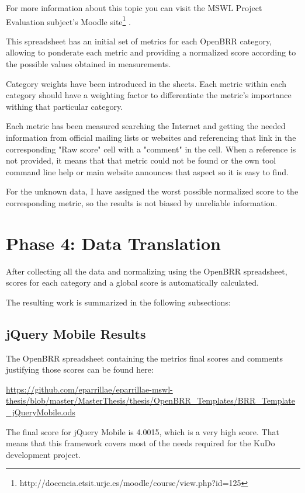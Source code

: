 \documentclass[a4paper,12pt]{book}
\begin{document}
For more information about this topic you can visit the MSWL Project Evaluation subject's Moodle site\footnote{http://docencia.etsit.urjc.es/moodle/course/view.php?id=125} .

This spreadsheet has an initial set of metrics for each OpenBRR category, allowing to ponderate each metric and providing a normalized score according to the possible values obtained in measurements.

Category weights have been introduced in the sheets. Each metric within each category should have a weighting factor to differentiate the metric's importance withing that particular category. 

Each metric has been measured searching the Internet and getting the needed information from official mailing lists or websites and referencing that link in the corresponding "Raw score" cell with a "comment" in the cell. When a reference is not provided, it means that that metric could not be found or the own tool command line help or main website announces that aspect so it is easy to find.

For the unknown data, I have assigned the worst possible normalized score to the corresponding metric, so the results is not biased by unreliable information.

\section{Phase 4: Data Translation}
\label{sec:phase4}

After collecting all the data and normalizing using the OpenBRR spreadsheet, scores for each category and a global score is automatically calculated.

The resulting work is summarized in the following subsections:

\subsection{jQuery Mobile Results}
\label{jQuery Mobile Results}

The OpenBRR spreadsheet containing the metrics final scores and comments justifying those scores can be found here:

\url{
https://github.com/eparrillae/eparrillae-mswl-thesis/blob/master/MasterThesis/thesis/OpenBRR_Templates/BRR_Template_jQueryMobile.ods}

The final score for jQuery Mobile is 4.0015, which is a very high score. That means that this framework covers most of the needs required for the KuDo development project.
\end{document}
